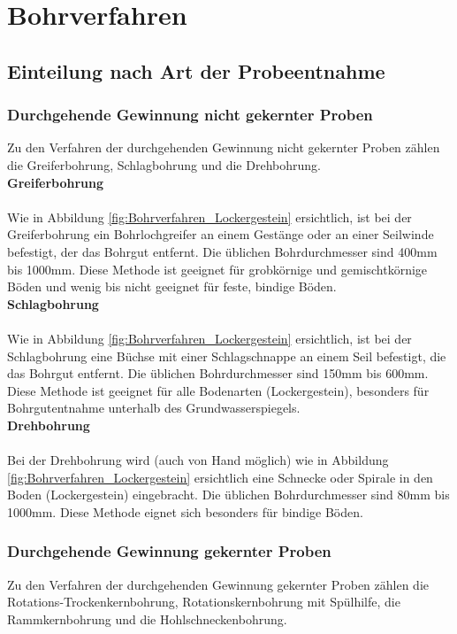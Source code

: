 \documentclass[12pt,a4paper,draft]{scrartcl} %
\begin{document}
\section{Bohrverfahren}
\subsection{Einteilung nach Art der Probeentnahme}
\subsubsection{Durchgehende Gewinnung nicht gekernter Proben}
Zu den Verfahren der durchgehenden Gewinnung nicht gekernter Proben zählen die Greiferbohrung, Schlagbohrung und die Drehbohrung.\\

\textbf{Greiferbohrung}\\\\
Wie in Abbildung \ref{fig:Bohrverfahren_Lockergestein} ersichtlich, ist bei der Greiferbohrung ein Bohrlochgreifer an einem Gestänge oder an einer Seilwinde befestigt, der das Bohrgut entfernt. Die üblichen Bohrdurchmesser sind 400mm bis 1000mm. Diese Methode ist geeignet für grobkörnige und gemischtkörnige Böden und wenig bis nicht geeignet für feste, bindige Böden.\\

\textbf{Schlagbohrung}\\\\
Wie in Abbildung \ref{fig:Bohrverfahren_Lockergestein} ersichtlich, ist bei der Schlagbohrung eine Büchse mit einer Schlagschnappe an einem Seil befestigt, die das Bohrgut entfernt. Die üblichen Bohrdurchmesser sind 150mm bis 600mm. Diese Methode ist geeignet für alle Bodenarten (Lockergestein), besonders für Bohrgutentnahme unterhalb des Grundwasserspiegels.\\

\textbf{Drehbohrung}\\\\
Bei der Drehbohrung wird (auch von Hand möglich) wie in Abbildung \ref{fig:Bohrverfahren_Lockergestein} ersichtlich eine Schnecke oder Spirale in den Boden (Lockergestein) eingebracht. Die üblichen Bohrdurchmesser sind 80mm bis 1000mm. Diese Methode eignet sich besonders für bindige Böden.

\subsubsection{Durchgehende Gewinnung gekernter Proben}
Zu den Verfahren der durchgehenden Gewinnung gekernter Proben zählen die Rotations-Trockenkernbohrung, Rotationskernbohrung mit Spülhilfe, die Rammkernbohrung und die Hohlschneckenbohrung.\\
\end{document}
